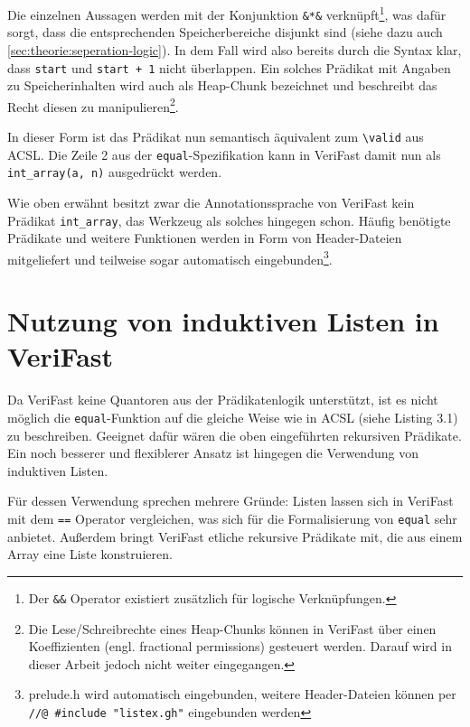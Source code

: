 Die einzelnen Aussagen werden mit der Konjunktion \lstinline{&*&} verknüpft\footnote{Der \lstinline{&&} Operator 
existiert zusätzlich für logische Verknüpfungen.}, was dafür sorgt, dass die entsprechenden
Speicherbereiche disjunkt sind (siehe dazu auch \ref{sec:theorie:seperation-logic}). In dem Fall wird also bereits
durch die Syntax klar, dass \lstinline{start} und \lstinline{start + 1} nicht überlappen. Ein solches Prädikat
mit Angaben zu Speicherinhalten wird auch als Heap-Chunk bezeichnet und beschreibt das Recht diesen zu
manipulieren\footnote{Die Lese/Schreibrechte eines Heap-Chunks können in VeriFast über einen Koeffizienten
(engl. fractional permissions) gesteuert werden. Darauf wird in dieser Arbeit jedoch nicht weiter eingegangen.}.

In dieser Form ist das Prädikat nun semantisch äquivalent zum \lstinline{\valid} aus ACSL. Die Zeile 2 aus
der \texttt{equal}-Spezifikation kann in VeriFast damit nun als \lstinline{int_array(a, n)} ausgedrückt werden.

Wie oben erwähnt besitzt zwar die Annotationssprache von VeriFast kein Prädikat \lstinline{int_array}, das Werkzeug
als solches hingegen schon. Häufig benötigte Prädikate und weitere Funktionen werden in Form von Header-Dateien
mitgeliefert und teilweise sogar automatisch eingebunden\footnote{prelude.h wird automatisch eingebunden, weitere 
Header-Dateien können per \\ \lstinline{//@ #include "listex.gh"} eingebunden werden}.


\section{Nutzung von induktiven Listen in VeriFast}
\label{sec:induktive-listen}

Da VeriFast keine Quantoren aus der Prädikatenlogik unterstützt, ist es nicht möglich die \texttt{equal}-Funktion
auf die gleiche Weise wie in ACSL (siehe Listing 3.1) zu beschreiben. Geeignet dafür wären die oben eingeführten
rekursiven Prädikate. Ein noch besserer und flexiblerer Ansatz ist hingegen die Verwendung von induktiven Listen.

Für dessen Verwendung sprechen mehrere Gründe: Listen lassen sich in VeriFast mit dem \lstinline{==} Operator vergleichen,
was sich für die Formalisierung von \texttt{equal} sehr anbietet. Außerdem bringt VeriFast etliche rekursive Prädikate
mit, die aus einem Array eine Liste konstruieren.




